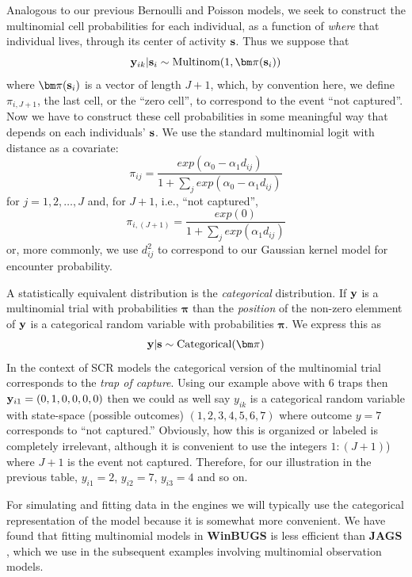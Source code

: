 Analogous to our previous Bernoulli and Poisson models, we seek to
construct the multinomial cell probabilities for each individual, as a
function of {\it where} that individual lives, through its center of
activity ${\bf s}$. Thus we suppose that
\begin{equation}
 {\bf y}_{ik}|{\bf s}_{i} \sim \mbox{Multinom}(1, {\bm \pi}({\bf s}_{i}) )
\label{poisson-mn.eq.mn}
\end{equation}
where ${\bm \pi}({\bf s}_{i})$ is a vector of length $J+1$, which, by
convention here, we define $\pi_{i,J+1}$, the last cell, or the ``zero
cell'', to correspond to the event ``not captured''.
Now we have to
construct these cell probabilities in some meaningful way that depends
on each individuals' ${\bf s}$.
We use the standard
multinomial logit with distance as a covariate:
\[
 \pi_{ij} = \frac{  exp(\alpha_{0} - \alpha_{1} d_{ij}) }{ 1+ \sum_{j}
   exp(\alpha_{0} - \alpha_{1} d_{ij})}
\]
for $j=1,2,\ldots,J$ and, for $J+1$, i.e., ``not captured'',
\[
 \pi_{i,(J+1)} = \frac{  exp(0) }
                    { 1+ \sum_{j} exp(\alpha_{1} d_{ij})}
\]
or, more commonly, we use $d_{ij}^{2}$ to correspond to our Gaussian
kernel model for encounter probability.

A statistically equivalent distribution is the {\it categorical}
distribution.  If ${\bf y}$ is a multinomial trial with probabilities
${\bm \pi}$ than the {\it position} of the non-zero elemment of ${\bf
  y}$ is a categorical random variable with probabilities ${\bm \pi}$.
We express this as
\[
{\bf y}|{\bf s} \sim \mbox{Categorical}( {\bm \pi} )
\]
In the context of SCR models the categorical version of the
multinomial trial corresponds to the {\it trap of capture}.  Using our
example above with 6 traps then ${\bf y}_{i1} = (0,1,0,0,0,0)$ then we
could as well say $y_{ik}$ is a categorical random variable with
state-space (possible outcomes) $(1,2,3,4,5,6,7)$ where outcome $y=7$
corresponds to ``not captured.'' Obviously, how this is organized or
labeled is completely irrelevant, although it is convenient to use the
integers $1:(J+1)$) where $J+1$ is the event not captured.  Therefore,
for our illustration in the previous table, $y_{i1} = 2$, $y_{i2} =
7$, $y_{i3} = 4$ and so on.

For simulating and fitting data in the \bugs engines we will typically use
the categorical representation of the model because it is somewhat
more convenient.  We have found that fitting multinomial models in
{\bf WinBUGS} is less efficient than {\bf JAGS}
\citep{converse_royle:2013}, which we use in the subsequent examples
involving multinomial 
observation models.




